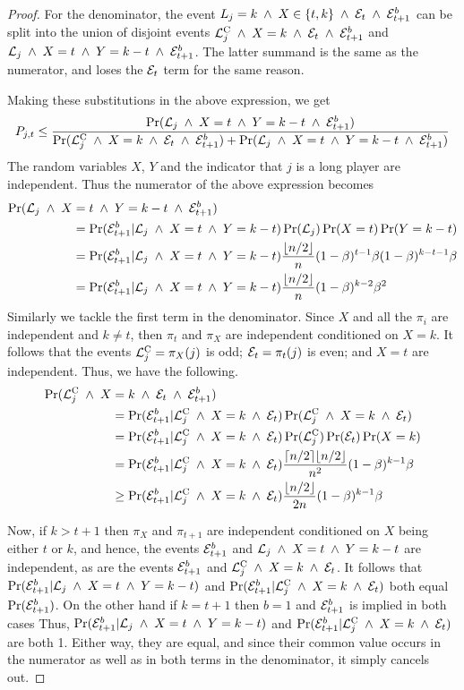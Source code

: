 \documentclass[12pt]{article}
\theoremstyle{definition}
\newcommand{\sand}{\;\land\;}
\newcommand{\Pjt}{P_{j,t}}
\begin{document}
\begin{proof}
For the denominator, the event $L_j=k \sand X \in\{t, k\} \sand 
\EEE \sand \EEEE$ can be split into the union of disjoint events 
$\shortp \sand X=k \sand \EEE \sand \EEEE$ and 
$\longp \sand X=t \sand Y=k-t \sand \EEEE$. The latter summand 
is the same as the numerator, and loses the $\mathcal{E}_t$ term for the same reason.

Making these substitutions in the above expression, we get 
\[
\Pjt \le \frac{\Pr(\longp \sand X=t \sand Y=k-t \sand \EEEE)}
{\Pr(\shortp \sand X=k \sand \EEE \sand \EEEE)
+\Pr(\longp \sand X=t \sand Y=k-t \sand \EEEE)}
\]
The random variables $X$, $Y$ and the indicator that $j$ is a long player
are independent. Thus the numerator of the above expression becomes
\begin{align*}
\Pr(\longp \sand X&=t \sand Y=k-t \sand \EEEE)\\
&= \Pr(\EEEE|\longp \sand X=t \sand Y=k-t) 
\Pr(\longp)\Pr(X=t)\Pr(Y=k-t)\\
&= \Pr(\EEEE|\longp \sand X=t \sand Y=k-t) 
\frac{\lfloor n/2\rfloor}{n} (1-\beta)^{t-1}\beta (1-\beta)^{k-t-1}\beta\\
&= \Pr(\EEEE|\longp \sand X=t \sand Y=k-t) 
\frac{\lfloor n/2\rfloor}{n} (1-\beta)^{k-2}\beta^2
\end{align*}
Similarly we tackle the first term in the denominator. Since $X$ and all the 
$\pi_i$ are independent and $k\ne t$, then $\pi_t$ and $\pi_X$ 
are independent conditioned on $X=k$. It follows that the events 
$\mathcal{L}_j^{\mathrm{C}} = \pi_X(j)$ is odd; $\mathcal{E}_t = \pi_t(j)$ is even; and $X=t$ are 
independent.  Thus, we have the following.
\begin{align*}
\Pr(\shortp \sand X&=k\sand \EEE \sand \EEEE)\\
&= \Pr(\EEEE|\shortp \sand X=k \sand \EEE) \Pr(\shortp \sand X=k \sand \EEE)\\
&= \Pr(\EEEE|\shortp \sand X=k \sand \EEE) \Pr(\shortp)\Pr(\EEE)\Pr(X=k)\\
&= \Pr(\EEEE|\shortp \sand X=k \sand \EEE) 
   \frac{\lceil n/2\rceil \lfloor n/2\rfloor}{n^2} (1-\beta)^{k-1}\beta \\
&\ge \Pr(\EEEE|\shortp \sand X=k \sand \EEE) 
\frac{\lfloor n/2\rfloor}{2n} (1-\beta)^{k-1}\beta
\end{align*}

Now, if $k>t+1$ then $\pi_X$ and $\pi_{t+1}$ are independent conditioned 
on $X$ being either $t$ or $k$, and hence, the events 
$\mathcal{E}^{b}_{t+1}$ and $\longp \sand X=t \sand Y=k-t$ are independent, as are the 
events
$\mathcal{E}^{b}_{t+1}$ and $\shortp \sand X=k \sand \EEE$.
It follows that $\Pr(\EEEE|\longp \sand X=t \sand Y=k-t)$ and 
$\Pr(\EEEE|\shortp \sand X=k \sand \EEE)$ both equal $\Pr(\mathcal{E}^{b}_{t+1})$.
On the other hand if $k=t+1$ then $b=1$ and $\mathcal{E}^{b}_{t+1}$ is implied  in both cases
Thus, $\Pr(\EEEE|\longp \sand X=t \sand Y=k-t)$ and 
$\Pr(\EEEE|\shortp \sand X=k \sand \EEE)$ are both 1. Either way, they are 
equal, and since their common value occurs in the numerator as well as in 
both terms in the denominator, it simply cancels out.  


\end{proof}
\end{document}
